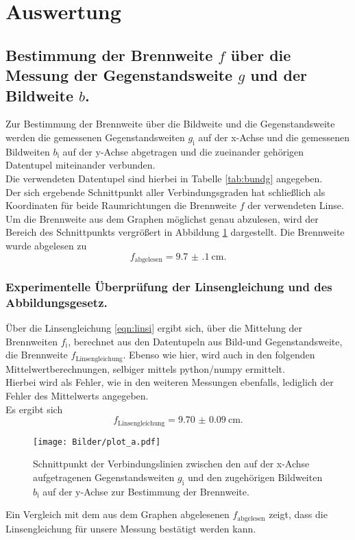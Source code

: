 \section{Auswertung}
\label{sec:Auswertung}
\subsection{Bestimmung der Brennweite $f$ über die Messung der Gegenstandsweite $g$ und der Bildweite $b$.}
Zur Bestimmung der Brennweite über die Bildweite und die Gegenstandsweite werden die gemessenen Gegenstandsweiten $g_{\mathrm{i}}$ auf der x-Achse und die gemessenen Bildweiten $b_{\mathrm{i}}$ auf der y-Achse abgetragen und die zueinander gehörigen Datentupel miteinander verbunden. \\
Die verwendeten Datentupel sind hierbei in Tabelle \ref{tab:bundg} angegeben.
\\Der sich ergebende Schnittpunkt aller Verbindungsgraden hat schließlich als Koordinaten für beide Raumrichtungen die Brennweite $f$ der verwendeten Linse. \\Um die Brennweite aus dem Graphen möglichst genau abzulesen, wird der Bereich des Schnittpunkts vergrößert in Abbildung \ref{fig:plota} dargestellt.
Die Brennweite wurde abgelesen zu
\begin{equation}
  f_{\mathrm{abgelesen}}=\SI{9.7(1)}{\centi\meter}\text{.}
\end{equation}
\subsubsection{Experimentelle Überprüfung der Linsengleichung und des Abbildungsgesetz.}
Über die Linsengleichung \eqref{eqn:linsi} ergibt sich, über die Mittelung der Brennweiten $f_{\mathrm{i}}$, berechnet aus den Datentupeln aus Bild-und Gegenstandsweite, die Brennweite $f_{\mathrm{Linsengleichung}}$.
Ebenso wie hier, wird auch in den folgenden Mittelwertberechnungen, selbiger mittels python/numpy \cite{numpy} ermittelt.\\
Hierbei wird als Fehler, wie in den weiteren Messungen ebenfalls, lediglich der Fehler des Mittelwerts angegeben.\\
Es ergibt sich
\begin{equation}
  f_{\mathrm{Linsengleichung}}=\SI{9.70(9)}{\centi\meter}\text{.}
\end{equation}

\begin{figure}
  \centering
  \texttt{[image: Bilder/plot\_a.pdf]}
  \caption{Schnittpunkt der Verbindungslinien zwischen den auf der x-Achse aufgetragenen Gegenstandsweiten $g_\mathrm{i}$ und den zugehörigen Bildweiten $b_\mathrm{i}$ auf der y-Achse zur Bestimmung der Brennweite.}
  \label{fig:plota}
\end{figure}
Ein Vergleich mit dem aus dem Graphen abgelesenen $f_{\mathrm{abgelesen}}$ zeigt, dass die Linsengleichung für unsere Messung bestätigt werden kann.


